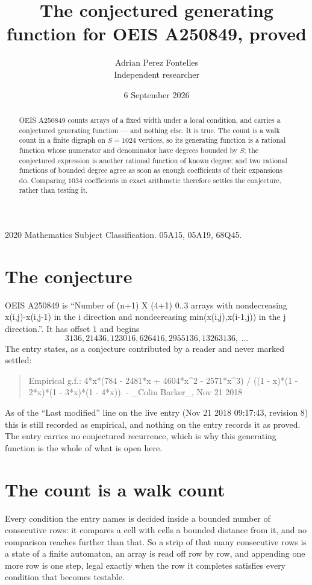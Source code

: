 \documentclass[11pt,a4paper]{article}
\title{The conjectured generating function for OEIS A250849, proved}
\author{Adrian Perez Fontelles\\ \small Independent researcher}
\date{6 September 2026}
\theoremstyle{plain}
\theoremstyle{definition}
\begin{document}
\maketitle

\begin{abstract}
OEIS A250849 counts arrays of a fixed width under a local condition, and carries a conjectured
generating function --- and nothing else. It is true. The count is a walk count in a finite
digraph on $S=1024$ vertices, so its generating function is a rational function whose numerator
and denominator have degrees bounded by $S$; the conjectured expression is another rational
function of known degree; and two rational functions of bounded degree agree as soon as enough
coefficients of their expansions do. Comparing $1034$ coefficients in exact arithmetic
therefore settles the conjecture, rather than testing it.
\end{abstract}

\noindent\small 2020 Mathematics Subject Classification. 05A15, 05A19, 68Q45.\normalsize

\section{The conjecture}

OEIS A250849 is ``Number of (n+1) X (4+1) 0..3 arrays with nondecreasing x(i,j)-x(i,j-1) in the i direction and nondecreasing min(x(i,j),x(i-1,j)) in the j direction.''. It has offset $1$ and begins
\[
3136, 21436, 123016, 626416, 2955136, 13263136,\ \dots
\]
The entry states, as a conjecture contributed by a reader and never marked settled:
\begin{quote}
Empirical g.f.: 4*x*(784 - 2481*x + 4604*x\^{}2 - 2571*x\^{}3) / ((1 - x)*(1 - 2*x)*(1 - 3*x)*(1 - 4*x)). - \_Colin Barker\_, Nov 21 2018
\end{quote}
As of the ``Last modified'' line on the live entry (Nov 21 2018 09:17:43, revision 8) this is still
recorded as empirical, and nothing on the entry records it as proved. The entry carries no
conjectured recurrence, which is why this generating function is the whole of what is open
here.

\section{The count is a walk count}

Every condition the entry names is decided inside a bounded number of consecutive rows: it
compares a cell with cells a bounded distance from it, and no comparison reaches further than
that. So a strip of that many consecutive rows is a state of a finite automaton, an array is
read off row by row, and appending one more row is one step, legal exactly when the row it
completes satisfies every condition that becomes testable.
\end{document}
